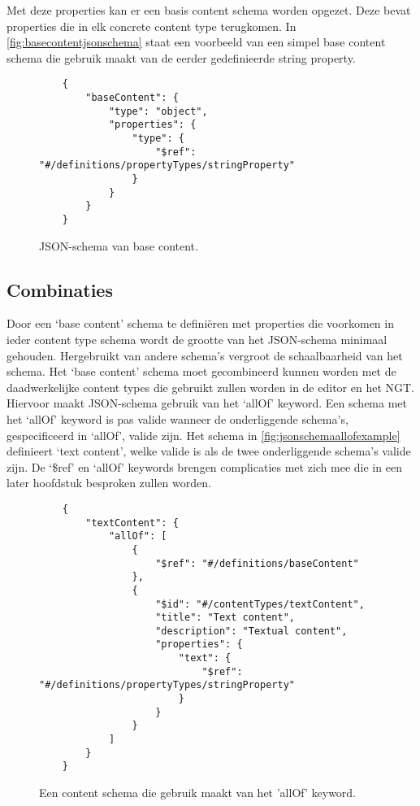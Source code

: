 \noindent Met deze properties kan er een basis content schema worden opgezet. Deze bevat properties die in elk concrete content type terugkomen. In \autoref{fig:basecontentjsonschema} staat een voorbeeld van een simpel base content schema die gebruik maakt van de eerder gedefinieerde string property.

\begin{figure}[htb]
    \centering
    \lstset{language=JSON}
    \begin{lstlisting}
    {
        "baseContent": {
            "type": "object",
            "properties": {
                "type": {
                    "$ref": "#/definitions/propertyTypes/stringProperty"
                }
            }
        }
    }               
    \end{lstlisting}
    \caption{JSON-schema van base content.}
    \label{fig:basecontentjsonschema}
\end{figure}

\subsection{Combinaties}
Door een ‘base content’ schema te definiëren met properties die voorkomen in ieder content type schema wordt de grootte van het JSON-schema minimaal gehouden. Hergebruikt van andere schema’s vergroot de schaalbaarheid van het schema.
Het ‘base content’ schema moet gecombineerd kunnen worden met de daadwerkelijke content types die gebruikt zullen worden in de editor en het NGT. Hiervoor maakt JSON-schema gebruik van het ‘allOf’ keyword. Een schema met het ‘allOf’ keyword is pas valide wanneer de onderliggende schema’s, gespecificeerd in ‘allOf’, valide zijn\cite{Droettboom2016}. Het schema in \autoref{fig:jsonschemaallofexample} definieert ‘text content’, welke valide is als de twee onderliggende schema’s valide zijn.
De ‘\$ref’ en ‘allOf’ keywords brengen complicaties met zich mee die in een later hoofdstuk besproken zullen worden.

\begin{figure}[htb]
    \centering
    \lstset{language=JSON}
    \begin{lstlisting}
    {
        "textContent": {
            "allOf": [
                {
                    "$ref": "#/definitions/baseContent"
                },
                {
                    "$id": "#/contentTypes/textContent",
                    "title": "Text content",
                    "description": "Textual content",
                    "properties": {
                        "text": {
                            "$ref": "#/definitions/propertyTypes/stringProperty"
                        }
                    }
                }
            ]
        }
    }
    \end{lstlisting}
    \caption{Een content schema die gebruik maakt van het 'allOf' keyword.}
    \label{fig:jsonschemaallofexample}
\end{figure}


